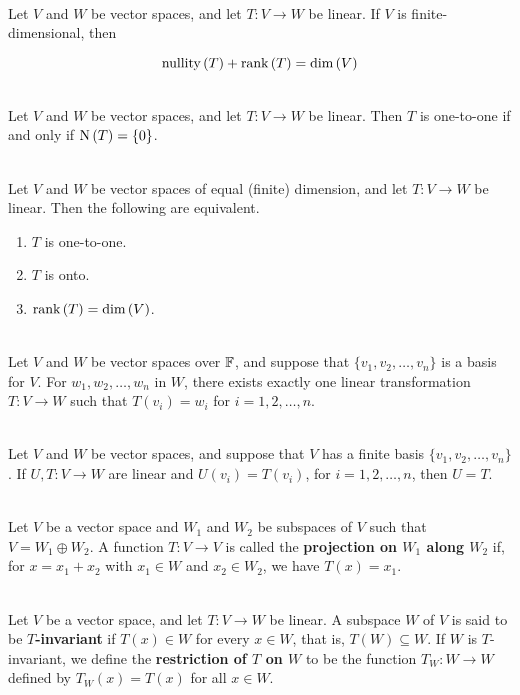 \begin{theorem}
	\hfill\\
	Let $V$ and $W$ be vector spaces, and let $T: V \to W$ be linear. If $V$ is finite-dimensional, then

	\[\text{nullity}\left(T\right) + \text{rank}\left(T\right) = \text{dim}\left(V\right)\]
\end{theorem}

\begin{theorem}
	\hfill\\
	Let $V$ and $W$ be vector spaces, and let $T: V \to W$ be linear. Then $T$ is one-to-one if and only if $\text{N}\left(T\right) = \{0\}$.
\end{theorem}

\begin{theorem}\label{Theorem 2.5}
	\hfill\\
	Let $V$ and $W$ be vector spaces of equal (finite) dimension, and let $T: V \to W$ be linear. Then the following are equivalent.

	\begin{enumerate}
		\item $T$ is one-to-one.
		\item $T$ is onto.
		\item $\text{rank}\left(T\right) = \text{dim}\left(V\right)$.
	\end{enumerate}
\end{theorem}

\begin{theorem}
	\hfill\\
	Let $V$ and $W$ be vector spaces over $\mathbb{F}$, and suppose that $\{v_1, v_2, \dots, v_n\}$ is a basis for $V$. For $w_1, w_2, \dots, w_n$ in $W$, there exists exactly one linear transformation $T: V \to W$ such that $T(v_i) = w_i$ for $i = 1, 2, \dots, n$.
\end{theorem}

\begin{corollary}\label{Corollary 2.1}
	\hfill\\
	Let $V$ and $W$ be vector spaces, and suppose that $V$ has a finite basis $\{v_1, v_2, \dots, v_n\}$. If $U,T: V \to W$ are linear and $U(v_i) = T(v_i)$, for $i = 1, 2, \dots, n$, then $U = T$.
\end{corollary}

\begin{definition}
	\hfill\\
	Let $V$ be a vector space and $W_1$ and $W_2$ be subspaces of $V$ such that $V = W_1 \oplus W_2$. A function $T: V \to V$ is called the \textbf{projection on $W_1$ along $W_2$} if, for $x = x_1 + x_2$ with $x_1 \in W$ and $x_2 \in W_2$, we have $T(x) = x_1$.
\end{definition}

\begin{definition}
	\hfill\\
	Let $V$ be a vector space, and let $T: V \to W$ be linear. A subspace $W$ of $V$ is said to be \textbf{$T$-invariant} if $T(x) \in W$ for every $x \in W$, that is, $T(W) \subseteq W$. If $W$ is $T$-invariant, we define the \textbf{restriction of $T$ on $W$} to be the function $T_W: W \to W$ defined by $T_W(x) = T(x)$ for all $x \in W$.
\end{definition}
